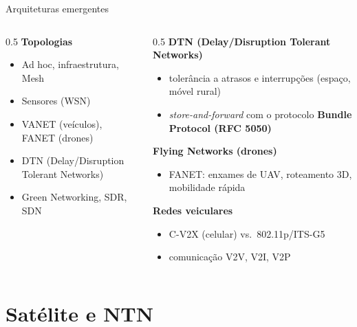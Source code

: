 \documentclass[aspectratio=169,11pt]{beamer}
\begin{document}
\begin{frame}{Arquiteturas emergentes}
  \begin{columns}
    \begin{column}{0.5\textwidth}
      \textbf{Topologias}
      \begin{itemize}
        \item Ad hoc, infraestrutura, Mesh
        \item Sensores (WSN)
        \item VANET (veículos), FANET (drones)
        \item DTN (Delay/Disruption Tolerant Networks)
        \item Green Networking, SDR, SDN
      \end{itemize}
    \end{column}
    \begin{column}{0.5\textwidth}
      \textbf{DTN (Delay/Disruption Tolerant Networks)}
      \begin{itemize}
        \item tolerância a atrasos e interrupções (espaço, móvel rural)
        \item \emph{store-and-forward} com o protocolo \textbf{Bundle Protocol (RFC 5050)}
      \end{itemize}
      \textbf{Flying Networks (drones)}
      \begin{itemize}
        \item FANET: enxames de UAV, roteamento 3D, mobilidade rápida
      \end{itemize}
      \textbf{Redes veiculares}
      \begin{itemize}
        \item C-V2X (celular) vs.\ 802.11p/ITS-G5
        \item comunicação V2V, V2I, V2P
      \end{itemize}
    \end{column}
  \end{columns}
\end{frame}

\section{Satélite e NTN}
\end{document}
